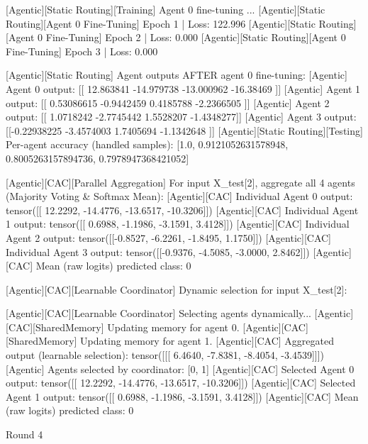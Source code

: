 [Agentic][Static Routing][Training] Agent 0 fine-tuning ...
[Agentic][Static Routing][Agent 0 Fine-Tuning] Epoch 1 | Loss: 122.996
[Agentic][Static Routing][Agent 0 Fine-Tuning] Epoch 2 | Loss: 0.000
[Agentic][Static Routing][Agent 0 Fine-Tuning] Epoch 3 | Loss: 0.000

[Agentic][Static Routing] Agent outputs AFTER agent 0 fine-tuning:
[Agentic] Agent 0 output: [[ 12.863841 -14.979738 -13.000962 -16.38469 ]]
[Agentic] Agent 1 output: [[ 0.53086615 -0.9442459   0.4185788  -2.2366505 ]]
[Agentic] Agent 2 output: [[ 1.0718242 -2.7745442  1.5528207 -1.4348277]]
[Agentic] Agent 3 output: [[-0.22938225 -3.4574003   1.7405694  -1.1342648 ]]
[Agentic][Static Routing][Testing] Per-agent accuracy (handled samples): [1.0, 0.9121052631578948, 0.8005263157894736, 0.7978947368421052]

[Agentic][CAC][Parallel Aggregation] For input X_test[2], aggregate all 4 agents (Majority Voting & Softmax Mean):
[Agentic][CAC] Individual Agent 0 output: tensor([[ 12.2292, -14.4776, -13.6517, -10.3206]])
[Agentic][CAC] Individual Agent 1 output: tensor([[ 0.6988, -1.1986, -3.1591,  3.4128]])
[Agentic][CAC] Individual Agent 2 output: tensor([[-0.8527, -6.2261, -1.8495,  1.1750]])
[Agentic][CAC] Individual Agent 3 output: tensor([[-0.9376, -4.5085, -3.0000,  2.8462]])
[Agentic][CAC] Mean (raw logits) predicted class: 0

[Agentic][CAC][Learnable Coordinator] Dynamic selection for input X_test[2]:

[Agentic][CAC][Learnable Coordinator] Selecting agents dynamically...
[Agentic][CAC][SharedMemory] Updating memory for agent 0.
[Agentic][CAC][SharedMemory] Updating memory for agent 1.
[Agentic][CAC] Aggregated output (learnable selection): tensor([[[ 6.4640, -7.8381, -8.4054, -3.4539]]])
[Agentic] Agents selected by coordinator: [0, 1]
[Agentic][CAC] Selected Agent 0 output: tensor([[ 12.2292, -14.4776, -13.6517, -10.3206]])
[Agentic][CAC] Selected Agent 1 output: tensor([[ 0.6988, -1.1986, -3.1591,  3.4128]])
[Agentic][CAC] Mean (raw logits) predicted class: 0

Round 4

